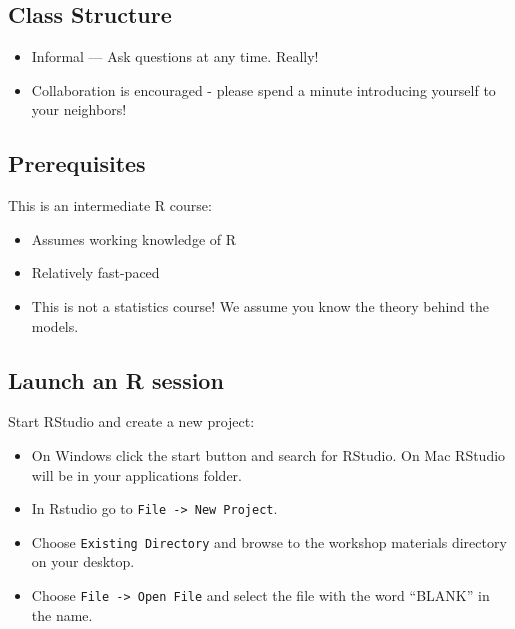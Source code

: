 \documentclass[]{book}
\providecommand{\tightlist}{%
  \setlength{\itemsep}{0pt}\setlength{\parskip}{0pt}}
\begin{document}
\hypertarget{class-structure-1}{%
\subsection{Class Structure}\label{class-structure-1}}

\begin{itemize}
\tightlist
\item
  Informal --- Ask questions at any time. Really!
\item
  Collaboration is encouraged - please spend a minute introducing yourself to your neighbors!
\end{itemize}

\hypertarget{prerequisites-1}{%
\subsection{Prerequisites}\label{prerequisites-1}}

This is an intermediate R course:

\begin{itemize}
\tightlist
\item
  Assumes working knowledge of R
\item
  Relatively fast-paced
\item
  This is not a statistics course! We assume you know the theory behind the models.
\end{itemize}

\hypertarget{launch-an-r-session-2}{%
\subsection{Launch an R session}\label{launch-an-r-session-2}}

Start RStudio and create a new project:

\begin{itemize}
\tightlist
\item
  On Windows click the start button and search for RStudio. On Mac
  RStudio will be in your applications folder.
\item
  In Rstudio go to \texttt{File\ -\textgreater{}\ New\ Project}.
\item
  Choose \texttt{Existing\ Directory} and browse to the workshop materials directory on your desktop.
\item
  Choose \texttt{File\ -\textgreater{}\ Open\ File} and select the file with the word ``BLANK'' in the name.
\end{itemize}
\end{document}
